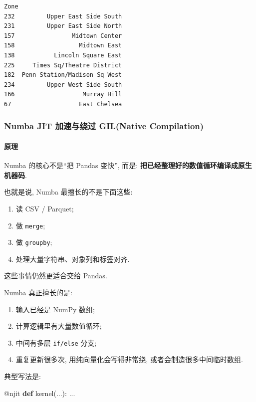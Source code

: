 \documentclass[11pt]{article}
\providecommand{\tightlist}{%
      \setlength{\itemsep}{0pt}\setlength{\parskip}{0pt}}
\newenvironment{Shaded}{}{}
\newcommand{\KeywordTok}[1]{\textcolor[rgb]{0.00,0.44,0.13}{\textbf{{#1}}}}
\newcommand{\NormalTok}[1]{{#1}}
\newcommand{\AttributeTok}[1]{\textcolor[rgb]{0.49,0.56,0.16}{{#1}}}
\begin{document}
\begin{Verbatim}[commandchars=\\\{\}]
                             Zone
232         Upper East Side South
231         Upper East Side North
157                Midtown Center
158                  Midtown East
138           Lincoln Square East
225     Times Sq/Theatre District
182  Penn Station/Madison Sq West
234         Upper West Side South
166                   Murray Hill
67                   East Chelsea
    \end{Verbatim}

    \subsubsection{Numba JIT 加速与绕过 GIL(Native
Compilation)}\label{numba-jit-ux52a0ux901fux4e0eux7ed5ux8fc7-gilnative-compilation}

    \paragraph{原理}\label{ux539fux7406}

    Numba 的核心不是``把 Pandas 变快'', 而是:
\textbf{把已经整理好的数值循环编译成原生机器码}.

也就是说, Numba 最擅长的不是下面这些:

\begin{enumerate}
\def\labelenumi{\arabic{enumi}.}
\tightlist
\item
  读 CSV / Parquet;
\item
  做 \texttt{merge};
\item
  做 \texttt{groupby};
\item
  处理大量字符串、对象列和标签对齐.
\end{enumerate}

这些事情仍然更适合交给 Pandas.

Numba 真正擅长的是:

\begin{enumerate}
\def\labelenumi{\arabic{enumi}.}
\tightlist
\item
  输入已经是 NumPy 数组;
\item
  计算逻辑里有大量数值循环;
\item
  中间有多层 \texttt{if/else} 分支;
\item
  重复更新很多次, 用纯向量化会写得非常绕, 或者会制造很多中间临时数组.
\end{enumerate}

典型写法是:

\begin{Shaded}
\begin{Highlighting}[]
\AttributeTok{@njit}
\KeywordTok{def}\NormalTok{ kernel(...):}
\NormalTok{    ...}
\end{Highlighting}
\end{Shaded}
\end{document}
